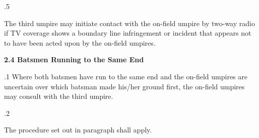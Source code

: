 \documentclass[12pt]{article}
\begin{document}
\vspace{\baselineskip}
\begin{adjustwidth}{0.5in}{0.24in}
{\fontsize{9pt}{10.8pt}.5 \tabto{0.49in} {\fontsize{8pt}{9.6pt}\selectfont The third umpire may initiate contact with the on-field umpire by two-way radio if TV coverage shows a boundary line infringement or incident that appears not to have been acted upon by the on-field umpires.\par}\par}\par

\end{adjustwidth}


\vspace{\baselineskip}

\vspace{\baselineskip}

\vspace{\baselineskip}

\vspace{\baselineskip}
\begin{Center}
{\fontsize{8pt}{9.6pt}\par}
\end{Center}\par


\vspace{\baselineskip}
{\fontsize{11pt}{13.2pt}\selectfont \textbf{2.4 \tabto{0.47in} Batsmen Running to the Same End}\par}\par


\vspace{\baselineskip}
\begin{adjustwidth}{0.5in}{0.1in}
{\fontsize{9pt}{10.8pt}.1 \tabto{0.49in} Where both batsmen have run to the same end and the on-field umpires are uncertain over which batsman made his/her ground first, the on-field umpires may consult with the third umpire.\par}\par

\end{adjustwidth}


\vspace{\baselineskip}
{\fontsize{9pt}{10.8pt}.2 \tabto{0.49in} {\fontsize{8pt}{9.6pt}\selectfont The procedure set out in paragraph shall apply.\par}\par}\par
\end{document}
